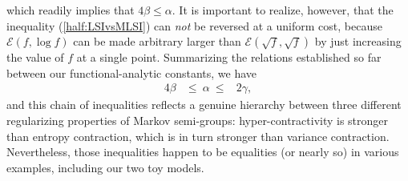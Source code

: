 \documentclass[12pt,final]{article}
\numberwithin{equation}{section}
\newcommand{\cE}{\mathscr {E}}
\begin{document}
which readily implies that $4\beta\le \alpha$. It is important to realize, however, that the inequality (\ref{half:LSIvsMLSI}) can \emph{not} be reversed at a uniform cost, because  $\cE(f,\log f)$ can be made arbitrary larger than $\cE(\sqrt{f},\sqrt{f})$ by just increasing the value of $f$ at a single point. Summarizing the relations established so far between our functional-analytic constants, we have
\begin{eqnarray}
\label{hierarchy}
4\beta & \le \ \alpha\ \le & 2\gamma,
\end{eqnarray} 
and this chain of inequalities reflects a genuine hierarchy between three different regularizing properties of Markov semi-groups: hyper-contractivity is stronger than entropy contraction, which is in turn stronger than variance contraction. Nevertheless, those inequalities happen to be equalities (or nearly so) in various examples, including  our two toy models.
\end{document}

